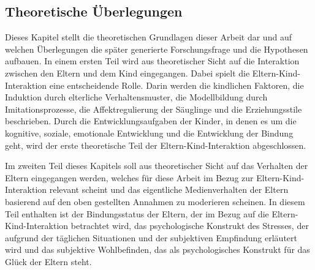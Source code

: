 \subsection{Theoretische Überlegungen}\label{sec:TheretischeÜberlegungen}
Dieses Kapitel stellt die theoretischen Grundlagen dieser Arbeit dar und auf welchen Überlegungen die später generierte Forschungsfrage und die Hypothesen aufbauen. 
In einem ersten Teil wird aus theoretischer Sicht auf die Interaktion zwischen den Eltern und dem Kind eingegangen. Dabei spielt die Eltern-Kind-Interaktion eine entscheidende Rolle. Darin werden die kindlichen Faktoren, die Induktion durch elterliche Verhaltensmuster, die Modellbildung durch Imitationsprozesse, die Affektregulierung der Säuglinge und die Erziehungsstile beschrieben. Durch die Entwicklungsaufgaben der Kinder, in denen es um die kognitive, soziale, emotionale Entwicklung und die Entwicklung der Bindung geht, wird der erste theoretische Teil der Eltern-Kind-Interaktion abgeschlossen.

Im zweiten Teil dieses Kapitels soll aus theoretischer Sicht auf das Verhalten der Eltern eingegangen werden, welches für diese Arbeit im Bezug zur Eltern-Kind-Interaktion relevant scheint und das eigentliche Medienverhalten der Eltern basierend auf den oben gestellten Annahmen zu moderieren scheinen. In diesem Teil enthalten ist der Bindungsstatus der Eltern, der im Bezug auf die Eltern-Kind-Interaktion betrachtet wird, das psychologische Konstrukt des Stresses, der aufgrund der täglichen Situationen und der subjektiven Empfindung erläutert wird und das subjektive Wohlbefinden, das als psychologisches Konstrukt für das Glück der Eltern steht.


